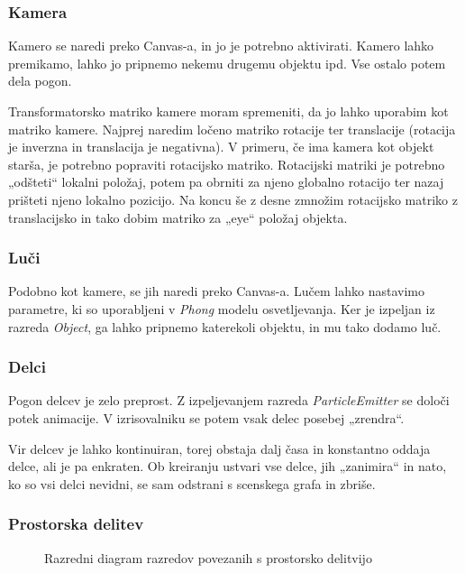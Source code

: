 \documentclass[a4paper]{article}
\begin{document}
\subsubsection{Kamera}
Kamero se naredi preko Canvas-a, in jo je potrebno aktivirati. Kamero lahko premikamo, lahko jo pripnemo nekemu drugemu objektu ipd. Vse ostalo potem dela pogon.

Transformatorsko matriko kamere moram spremeniti, da jo lahko uporabim kot matriko kamere. Najprej naredim ločeno matriko rotacije ter translacije (rotacija je inverzna in translacija je negativna). V primeru, če ima kamera kot objekt starša, je potrebno popraviti rotacijsko matriko. Rotacijski matriki je potrebno „odšteti“ lokalni položaj, potem pa obrniti za njeno globalno rotacijo ter nazaj prišteti njeno lokalno pozicijo. Na koncu še z desne zmnožim rotacijsko matriko z translacijsko in tako dobim matriko za „eye“ položaj objekta.

\subsubsection{Luči}
Podobno kot kamere, se jih naredi preko Canvas-a. Lučem lahko nastavimo parametre, ki so uporabljeni v \emph{Phong} modelu osvetljevanja. Ker je izpeljan iz razreda \emph{Object}, ga lahko pripnemo katerekoli objektu, in mu tako dodamo luč.

\subsubsection{Delci}
Pogon delcev je zelo preprost. Z izpeljevanjem razreda \emph{ParticleEmitter} se določi potek animacije. V izrisovalniku se potem vsak delec posebej „zrendra“.

Vir delcev je lahko kontinuiran, torej obstaja dalj časa in konstantno oddaja delce, ali je pa enkraten. Ob kreiranju ustvari vse delce, jih „zanimira“ in nato, ko so vsi delci nevidni, se sam odstrani s scenskega grafa in zbriše.

\subsubsection{Prostorska delitev}
\begin{figure}
  \centering
  
  \caption{Razredni diagram razredov povezanih s prostorsko delitvijo}
  \label{graf:scene_partitioning}
\end{figure}
\end{document}

